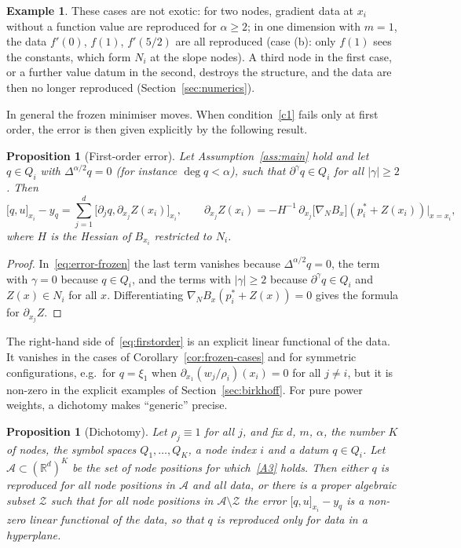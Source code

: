 \documentclass[12pt]{amsart}
\newtheorem{proposition}[theorem]{Proposition}
\theoremstyle{definition}
\newtheorem{example}[theorem]{Example}
\theoremstyle{remark}
\newcommand{\R}{\mathbb{R}}
\newcommand{\fpz}[3]{\bigl[#1,#2\bigr]_{#3}}     %
\begin{document}
\begin{example}
These cases are not exotic: for two nodes, gradient data at $x_i$ without a function value are
reproduced for $\alpha\ge2$; in one dimension with $m=1$, the data $f'(0)$, $f(1)$, $f'(5/2)$
are all reproduced (case (b): only $f(1)$ sees the constants, which form $N_i$ at the slope
nodes). A third node in the first case, or a further value datum in the second, destroys the
structure, and the data are then no longer reproduced (Section~\ref{sec:numerics}).
\end{example}

In general the frozen minimiser moves. When condition~\ref{c1} fails only at first order, the
error is then given explicitly by the following result.

\begin{proposition}[First-order error]\label{prop:firstorder}
Let Assumption~\ref{ass:main} hold and let $q\in Q_i$ with $\Delta^{\alpha/2}q=0$ (for instance
$\deg q<\alpha$), such that $\partial^\gamma q\in Q_i$ for all $|\gamma|\ge2$. Then
\begin{equation}\label{eq:firstorder}
  \fpz{q}{u}{x_i}-y_q=\sum_{j=1}^d\fpz{\partial_jq}{\partial_{x_j}Z(x_i)}{x_i},\qquad
  \partial_{x_j}Z(x_i)=-H^{-1}\,\partial_{x_j}\bigl[\nabla_NB_x\bigr](p_i^*+Z(x_i))\Big|_{x=x_i},
\end{equation}
where $H$ is the Hessian of $B_{x_i}$ restricted to $N_i$.
\end{proposition}

\begin{proof}
In~\eqref{eq:error-frozen} the last term vanishes because $\Delta^{\alpha/2}q=0$, the term with
$\gamma=0$ because $q\in Q_i$, and the terms with $|\gamma|\ge2$ because $\partial^\gamma q\in Q_i$
and $Z(x)\in N_i$ for all $x$. Differentiating $\nabla_NB_x(p_i^*+Z(x))=0$ gives the formula for
$\partial_{x_j}Z$.
\end{proof}

The right-hand side of~\eqref{eq:firstorder} is an explicit linear functional of the data. It
vanishes in the cases of Corollary~\ref{cor:frozen-cases} and for symmetric configurations,
e.g.\ for $q=\xi_1$ when $\partial_{x_1}(w_j/\rho_i)(x_i)=0$ for all $j\ne i$, but it is non-zero
in the explicit examples of Section~\ref{sec:birkhoff}. For pure power weights, a dichotomy
makes ``generic'' precise.

\begin{proposition}[Dichotomy]\label{prop:dichotomy}
Let $\rho_j\equiv1$ for all $j$, and fix $d$, $m$, $\alpha$, the number $K$ of nodes, the symbol
spaces $Q_1,\dots,Q_K$, a node index $i$ and a datum $q\in Q_i$. Let $\mathcal A\subset(\R^d)^K$ be
the set of node positions for which~\ref{A3} holds. Then either $q$ is reproduced for all node
positions in $\mathcal A$ and all data, or there is a proper algebraic subset $\mathcal Z$ such that
for all node positions in $\mathcal A\setminus\mathcal Z$ the error $\fpz{q}{u}{x_i}-y_q$ is a
non-zero linear functional of the data, so that $q$ is reproduced only for data in a hyperplane.
\end{proposition}
\end{document}
